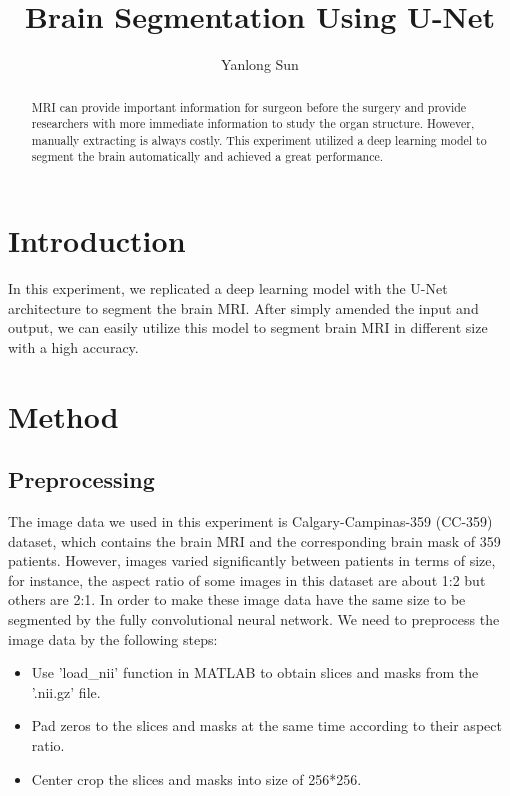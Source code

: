 \documentclass[12pt]{article}
\author{Yanlong Sun}
\title{Brain Segmentation Using U-Net}
\begin{document}
\maketitle

\begin{abstract}
MRI can provide important information for surgeon before the surgery and provide researchers with more immediate information to study the organ structure. However, manually extracting is always costly. This experiment utilized a deep learning model to segment the brain automatically and achieved a great performance.
\end{abstract}


\section{Introduction}
In this experiment, we replicated a deep learning model with the U-Net architecture \cite{buda} to segment the brain MRI. After simply amended the input and output, we can easily utilize this model to segment brain MRI in different size with a high accuracy.


\section{Method}

\subsection{Preprocessing}
The image data we used in this experiment is Calgary-Campinas-359 \cite{dataset}(CC-359) dataset, which contains the brain MRI and the corresponding brain mask of 359 patients. However, images varied significantly between patients in terms of size, for instance, the aspect ratio of some images in this dataset are about 1:2 but others are 2:1. In order to make these image data have the same size to be segmented by the fully convolutional neural network. We need to preprocess the image data by the following steps:
\begin{itemize}
	\item Use 'load\_nii' function in MATLAB to obtain slices and masks from the '.nii.gz' file.
	\item Pad zeros to the slices and masks at the same time according to their aspect ratio.
	\item Center crop the slices and masks into size of 256*256.
\end{itemize} 
\end{document}
